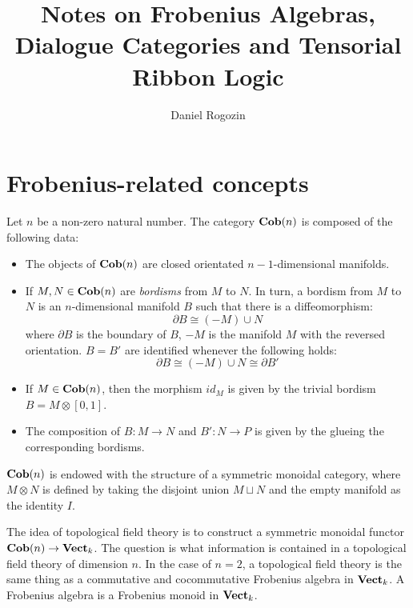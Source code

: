 \documentclass[8pt]{article}
\title{Notes on Frobenius Algebras, Dialogue Categories and Tensorial Ribbon Logic}
\author{Daniel Rogozin}
\date{ }
\theoremstyle{definition}
\theoremstyle{definition}
\theoremstyle{definition}
\theoremstyle{definition}
\theoremstyle{definition}
\theoremstyle{definition}
\theoremstyle{definition}
\theoremstyle{definition}
\theoremstyle{definition}
\theoremstyle{definition}
\theoremstyle{definition}
\theoremstyle{definition}
\theoremstyle{definition}
\theoremstyle{definition}
\theoremstyle{question}
\begin{document}
\maketitle

\tableofcontents

\section{Frobenius-related concepts}

Let $n$ be a non-zero natural number. The category ${\bf Cob}(n)$ is composed of the following data:
\begin{itemize}
  \item The objects of ${\bf Cob}(n)$ are closed orientated $n-1$-dimensional manifolds.
  \item If $M, N \in {\bf Cob}(n)$ are \emph{bordisms} from $M$ to $N$. In turn, a bordism from
  $M$ to $N$ is an $n$-dimensional manifold $B$ such that there is a diffeomorphism:
  \[
  \partial B \cong (- M) \cup N
  \]
  where $\partial B$ is the boundary of $B$, $- M$ is the manifold $M$ with the reversed orientation. $B = B'$
  are identified whenever the following holds:
  \[
  \partial B \cong (- M) \cup N \cong \partial B'
  \]
  \item If $M \in {\bf Cob}(n)$, then the morphism $id_M$ is given by the trivial bordism $B = M \otimes [0, 1]$.
  \item The composition of $B : M \to N$ and $B' : N \to P$ is given by the glueing the corresponding bordisms.
\end{itemize}

${\bf Cob}(n)$ is endowed with the structure of a symmetric monoidal category, where $M \otimes N$ is defined 
by taking the disjoint union $M \sqcup N$ and the empty manifold as the identity $I$.

The idea of topological field theory is to construct a symmetric monoidal functor 
${\bf Cob}(n) \to {\bf Vect}_k$. The question is what information is contained in a topological field theory of
dimension $n$. In the case of $n = 2$, a topological field theory is the same thing as a commutative and cocommutative
Frobenius algebra in ${\bf Vect}_k$. A Frobenius algebra is a Frobenius monoid in ${\bf Vect}_k$.
\end{document}
